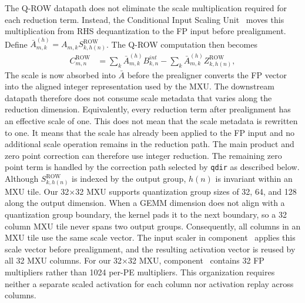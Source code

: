 \documentclass[sigconf,anonymous,nonacm]{acmart}
\newcommand{\qrow}{Q-ROW}
\newcommand{\blackcircletext}[1]{%
  \tikz[baseline=-0.5ex]{
    \node[
      circle,
      fill=black,
      text=white,
      inner sep=0pt,
      minimum size=7pt,
      font=\fontsize{5}{5}\selectfont\bfseries
    ] (char) {#1};
  }%
}
\begin{document}
The \qrow{} datapath does not eliminate the scale multiplication required for each reduction term.
Instead, the Conditional Input Scaling Unit~\blackcircletext{1} moves this multiplication from RHS dequantization to the FP input before prealignment.
Define $\bar{A}^{(h)}_{m,k}=A_{m,k}S^{\mathrm{ROW}}_{k,h(n)}$. The \qrow{} computation then becomes
\begin{align}
    C^{\mathrm{ROW}}_{m,n}
    &=
    \sum_k \bar{A}^{(h)}_{m,k} B^{int}_{k,n}
    -
    \sum_k \bar{A}^{(h)}_{m,k} Z^{\mathrm{ROW}}_{k,h(n)},
    \label{eq:qrow-fpint}
\end{align}
The scale is now absorbed into $\bar{A}$ before the prealigner converts the FP vector into the aligned integer representation used by the MXU.
The downstream datapath therefore does not consume scale metadata that varies along the reduction dimension.
Equivalently, every reduction term after prealignment has an effective scale of one.
This does not mean that the scale metadata is rewritten to one. It means that the scale has already been applied to the FP input and no additional scale operation remains in the reduction path.
The main product and zero point correction can therefore use integer reduction.
The remaining zero point term is handled by the correction path selected by \texttt{qdir} as described below.
Although $S^{\mathrm{ROW}}_{k,h(n)}$ is indexed by the output group, $h(n)$ is invariant within an MXU tile.
Our 32$\times$32 MXU supports quantization group sizes of 32, 64, and 128 along the output dimension.
When a GEMM dimension does not align with a quantization group boundary, the kernel pads it to the next boundary, so a 32 column MXU tile never spans two output groups.
Consequently, all columns in an MXU tile use the same scale vector.
The input scaler in component~\blackcircletext{1} applies this scale vector before prealignment, and the resulting activation vector is reused by all 32 MXU columns.
For our 32$\times$32 MXU, component~\blackcircletext{1} contains 32 FP multipliers rather than 1024 per-PE multipliers.
This organization requires neither a separate scaled activation for each column nor activation replay across columns.
\end{document}
